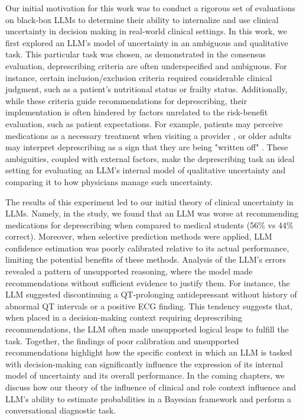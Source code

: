 Our initial motivation for this work was to conduct a rigorous set of evaluations on black-box LLMs to determine their ability to internalize and use clinical uncertainty in decision making in real-world clinical settings. In this work, we first explored an LLM's model of uncertainty in an ambiguous and qualitative task. This particular task was chosen, as demonstrated in the consensus evaluation, deprescribing criteria are often underspecified and ambiguous. For instance, certain inclusion/exclusion criteria required considerable clinical judgment, such as a patient's nutritional status or frailty status. Additionally, while these criteria guide recommendations for deprescribing, their implementation is often hindered by factors unrelated to the risk-benefit evaluation, such as patient expectations. For example, patients may perceive medications as a necessary treatment when visiting a provider \citep{robinsonAttitudesBarriersDeprescribing2024}, or older adults may interpret deprescribing as a sign that they are being "written off" \citep{wallisSwimmingTidePrimary2017}. These ambiguities, coupled with external factors, make the deprescribing task an ideal setting for evaluating an LLM's internal model of qualitative uncertainty and comparing it to how physicians manage such uncertainty.

The results of this experiment led to our initial theory of clinical uncertainty in LLMs. Namely, in the study, we found that an LLM was worse at recommending medications for deprescribing when compared to medical students (56\% vs 44\% correct). Moreover, when selective prediction methods were applied, LLM confidence estimation was poorly calibrated relative to its actual performance, limiting the potential benefits of these methods. Analysis of the LLM's errors revealed a pattern of unsupported reasoning, where the model made recommendations without sufficient evidence to justify them. For instance, the LLM suggested discontinuing a QT-prolonging antidepressant without history of abnormal QT intervals or a positive ECG finding. This tendency suggests that, when placed in a decision-making context requiring deprescribing recommendations, the LLM often made unsupported logical leaps to fulfill the task. Together, the findings of poor calibration and unsupported recommendations highlight how the specific context in which an LLM is tasked with decision-making can significantly influence the expression of its internal model of uncertainty and its overall performance. In the coming chapters, we discuss how our theory of the influence of clinical and role context influence and LLM's ability to estimate probabilities in a Bayesian framework and perform a conversational diagnostic task. 